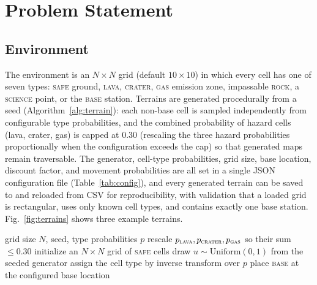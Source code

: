 \documentclass[conference]{IEEEtran}
\begin{document}
\section{Problem Statement}\label{sec:problem}

\subsection{Environment}

The environment is an $N \times N$ grid (default $10 \times 10$) in which every cell has one of seven types: \textsc{safe} ground, \textsc{lava}, \textsc{crater}, \textsc{gas} emission zone, impassable \textsc{rock}, a \textsc{science} point, or the \textsc{base} station. Terrains are generated procedurally from a seed (Algorithm~\ref{alg:terrain}): each non-base cell is sampled independently from configurable type probabilities, and the combined probability of hazard cells (lava, crater, gas) is capped at $0.30$ (rescaling the three hazard probabilities proportionally when the configuration exceeds the cap) so that generated maps remain traversable. The generator, cell-type probabilities, grid size, base location, discount factor, and movement probabilities are all set in a single JSON configuration file (Table~\ref{tab:config}), and every generated terrain can be saved to and reloaded from CSV for reproducibility, with validation that a loaded grid is rectangular, uses only known cell types, and contains exactly one base station. Fig.~\ref{fig:terrains} shows three example terrains.

\begin{algorithm}[t]
  \caption{Procedural terrain generation}
  \label{alg:terrain}
  \begin{algorithmic}[1]
    \REQUIRE grid size $N$, seed, type probabilities $p$
    \STATE rescale $p_{\textsc{lava}}, p_{\textsc{crater}}, p_{\textsc{gas}}$ so their sum $\le 0.30$
    \STATE initialize an $N \times N$ grid of \textsc{safe} cells
      \STATE draw $u \sim \mathrm{Uniform}(0, 1)$ from the seeded generator
      \STATE assign the cell type by inverse transform over $p$
    \ENDFOR
    \STATE place \textsc{base} at the configured base location
  \end{algorithmic}
\end{algorithm}
\end{document}
